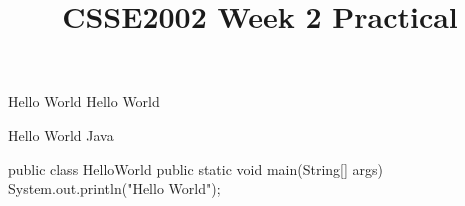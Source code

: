 \documentclass[week2]{csse2002}
\title{CSSE2002 Week 2 Practical}
\begin{document}
\begin{frame} 
\maketitle
\end{frame}

\begin{topic}{Hello World}
Hello World
\end{topic}

\begin{topic}{Hello World Java}
\begin{java}
public class HelloWorld {
    public static void main(String[] args) {
        System.out.println("Hello World");
    }
}
\end{java}
\end{topic}
\end{document}
